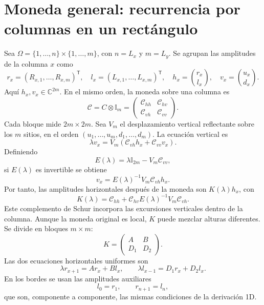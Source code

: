 \documentclass[11pt,a4paper]{article}
\newcommand{\Id}{\mathbb I}
\numberwithin{equation}{section}
\begin{document}
\section{Moneda general: recurrencia por columnas en un rectángulo}
Sea $\Omega=\{1,\ldots,n\}\times\{1,\ldots,m\}$, con $n=L_x$ y $m=L_y$. Se agrupan las amplitudes de la columna $x$ como
\begin{equation}
 r_x=(R_{x,1},\ldots,R_{x,m})^{\mathsf T},\quad
 l_x=(L_{x,1},\ldots,L_{x,m})^{\mathsf T},\quad
 h_x=\binom{r_x}{l_x},\quad v_x=\binom{u_x}{d_x}.
\end{equation}
Aquí $h_x,v_x\in\mathbb C^{2m}$. En el mismo orden, la moneda sobre una columna es
\begin{equation}
 \mathcal C=C\otimes\Id_m=
 \begin{pmatrix}\mathcal C_{hh}&\mathcal C_{hv}\\
 \mathcal C_{vh}&\mathcal C_{vv}\end{pmatrix}.
\end{equation}
Cada bloque mide $2m\times2m$. Sea $V_m$ el desplazamiento vertical reflectante sobre los $m$ sitios, en el orden $(u_1,\ldots,u_m,d_1,\ldots,d_m)$. La ecuación vertical es
\begin{equation}
 \lambda v_x=V_m(\mathcal C_{vh}h_x+\mathcal C_{vv}v_x).
\end{equation}
Definiendo
\begin{equation}\label{eq:E}
 E(\lambda)=\lambda\Id_{2m}-V_m\mathcal C_{vv},
\end{equation}
si $E(\lambda)$ es invertible se obtiene
\begin{equation}\label{eq:v}
 v_x=E(\lambda)^{-1}V_m\mathcal C_{vh}h_x.
\end{equation}
Por tanto, las amplitudes horizontales después de la moneda son $K(\lambda)h_x$, con
\begin{equation}\label{eq:K}
 \boxed{K(\lambda)=\mathcal C_{hh}
 +\mathcal C_{hv}E(\lambda)^{-1}V_m\mathcal C_{vh}.}
\end{equation}
Este complemento de Schur incorpora las excursiones verticales dentro de la columna. Aunque la moneda original es local, $K$ puede mezclar alturas diferentes. Se divide en bloques $m\times m$:
\begin{equation}
 K=\begin{pmatrix}A&B\\D_1&D_2\end{pmatrix}.
\end{equation}
Las dos ecuaciones horizontales uniformes son
\begin{equation}\label{eq:horizontal}
 \lambda r_{x+1}=Ar_x+Bl_x,\qquad
 \lambda l_{x-1}=D_1r_x+D_2l_x.
\end{equation}
En los bordes se usan las amplitudes auxiliares
\begin{equation}\label{eq:ghost}
 l_0=r_1,\qquad r_{n+1}=l_n,
\end{equation}
que son, componente a componente, las mismas condiciones de la derivación 1D.
\end{document}
